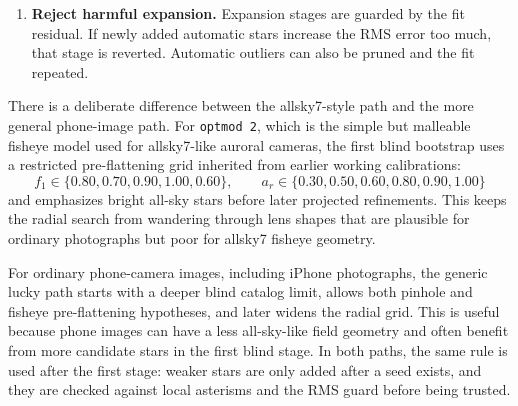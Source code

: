 \documentclass[11pt]{article}
\begin{document}
\begin{enumerate}
        use projected catalog positions to add fainter detections. Each new
        weak-star pairing must participate in one or two consistent triangle
        checks with already trusted pairs before it is accepted. This prevents
        isolated false detections from entering the fit merely because they are
        near a projected catalog star.
  \item \textbf{Reject harmful expansion.} Expansion stages are guarded by the
        fit residual. If newly added automatic stars increase the RMS error too
        much, that stage is reverted. Automatic outliers can also be pruned and
        the fit repeated.
\end{enumerate}

There is a deliberate difference between the allsky7-style path and the more
general phone-image path. For \texttt{optmod 2}, which is the simple but
malleable fisheye model used for allsky7-like auroral cameras, the first blind
bootstrap uses a restricted pre-flattening grid inherited from earlier working
calibrations:
\begin{equation}
  f_1 \in \{0.80,0.70,0.90,1.00,0.60\},
  \qquad
  a_r \in \{0.30,0.50,0.60,0.80,0.90,1.00\}
\end{equation}
and emphasizes bright all-sky stars before later projected refinements. This
keeps the radial search from wandering through lens shapes that are plausible
for ordinary photographs but poor for allsky7 fisheye geometry.

For ordinary phone-camera images, including iPhone photographs, the generic
lucky path starts with a deeper blind catalog limit, allows both pinhole and
fisheye pre-flattening hypotheses, and later widens the radial grid. This is
useful because phone images can have a less all-sky-like field geometry and
often benefit from more candidate stars in the first blind stage. In both
paths, the same rule is used after the first stage: weaker stars are only added
after a seed exists, and they are checked against local asterisms and the RMS
guard before being trusted.
\end{document}
